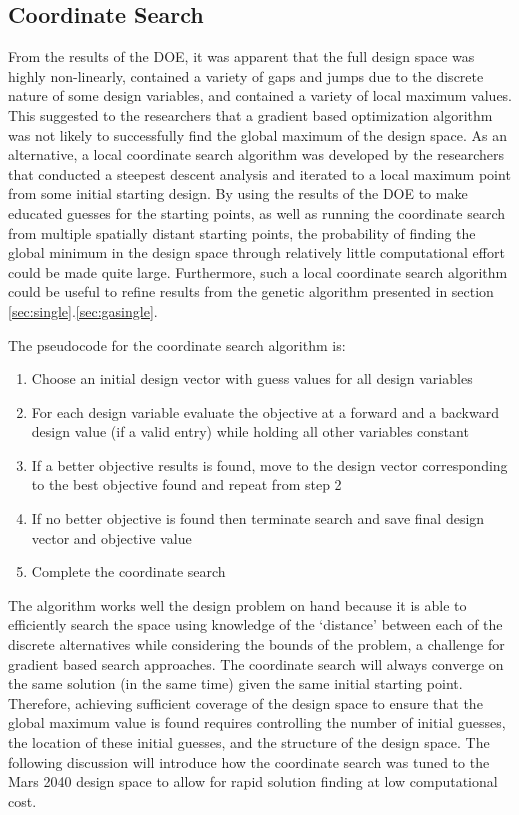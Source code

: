 \documentclass[]{aiaa-pretty}
\begin{document}
\subsection{Coordinate Search}
\label{sec:coordinate}
From the results of the DOE, it was apparent that the full design space was highly non-linearly, contained a variety of gaps and jumps due to the discrete nature of some design variables, and contained a variety of local maximum values. This suggested to the researchers that a gradient based optimization algorithm was not likely to successfully find the global maximum of the design space. As an alternative, a local coordinate search algorithm was developed by the researchers that conducted a steepest descent analysis and iterated to a local maximum point from some initial starting design. By using the results of the DOE to make educated guesses for the starting points, as well as running the coordinate search from multiple spatially distant starting points, the probability of finding the global minimum in the design space through relatively little computational effort could be made quite large. Furthermore, such a local coordinate search algorithm could be useful to refine results from the genetic algorithm presented in section \ref{sec:single}.\ref{sec:gasingle}. 

The pseudocode for the coordinate search algorithm is:
\begin{enumerate}
  \item Choose an initial design vector with guess values for all design variables
  \item For each design variable evaluate the objective at a forward and a backward design value (if a valid entry) while holding all other variables constant
  \item If a better objective results is found, move to the design vector corresponding to the best objective found and repeat from step 2
  \item If no better objective is found then terminate search and save final design vector and objective value
  \item Complete the coordinate search
\end{enumerate}

The algorithm works well the design problem on hand because it is able to efficiently search the space using knowledge of the ‘distance’ between each of the discrete alternatives while considering the bounds of the problem, a challenge for gradient based search approaches. The coordinate search will always converge on the same solution (in the same time) given the same initial starting point. Therefore, achieving sufficient coverage of the design space to ensure that the global maximum value is found requires controlling the number of initial guesses, the location of these initial guesses, and the structure of the design space. The following discussion will introduce how the coordinate search was tuned to the Mars 2040 design space to allow for rapid solution finding at low computational cost. 
\end{document}
